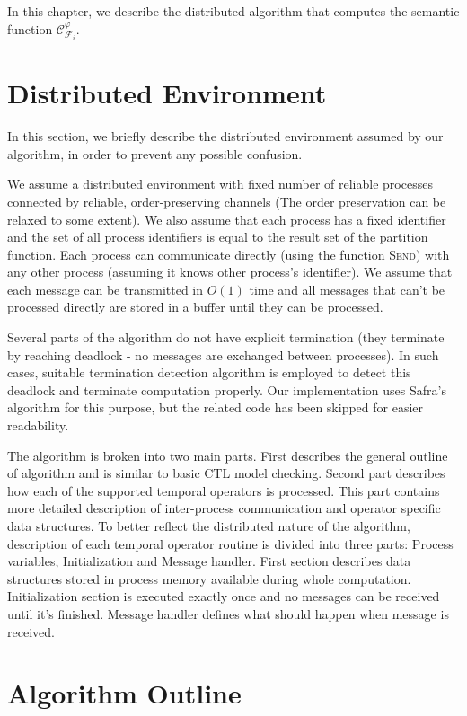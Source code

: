 \documentclass[12pt,oneside]{fithesis2}
\newcommand{\sem}{\ensuremath{\mathcal{C}_{\kf{i}{}}^\varphi}}
\newcommand{\method}[1]{\textnormal{\textsc{#1}}}
\newcommand{\kf}[2]{\ensuremath{\mathcal{F}^{#2}_{#1}}}
\begin{document}
    	In this chapter, we describe the distributed algorithm that computes the semantic function $\sem$. 
    	
    	\section{Distributed Environment}
    	
		In this section, we briefly describe the distributed environment assumed by our algorithm, in order to prevent any possible confusion.
		
		We assume a distributed environment with fixed number of reliable processes connected by reliable, order-preserving channels (The order preservation can be relaxed to some extent). We also assume that each process has a fixed identifier and the set of all process identifiers is equal to the result set of the partition function. Each process can communicate directly (using the function \method{Send}) with any other process (assuming it knows other process's identifier). We assume that each message can be transmitted in $O(1)$ time and all messages that can't be processed directly are stored in a buffer until they can be processed.		
		
		Several parts of the algorithm do not have explicit termination (they terminate by reaching deadlock - no messages are exchanged between processes). In such cases, suitable termination detection algorithm is employed to detect this deadlock and terminate computation properly. Our implementation uses Safra's algorithm \cite{safra} for this purpose, but the related code has been skipped for easier readability.
    	
		The algorithm is broken into two main parts. First describes the general outline of algorithm and is similar to basic CTL model checking. Second part describes how each of the supported temporal operators is processed. This part contains more detailed description of inter-process communication and operator specific data structures. To better reflect the distributed nature of the algorithm, description of each temporal operator routine is divided into three parts: Process variables, Initialization and Message handler. First section describes data structures stored in process memory available during whole computation. Initialization section is executed exactly once and no messages can be received until it's finished. Message handler defines what should happen when message is received.  
		
		\section{Algorithm Outline}
		
\end{document}
